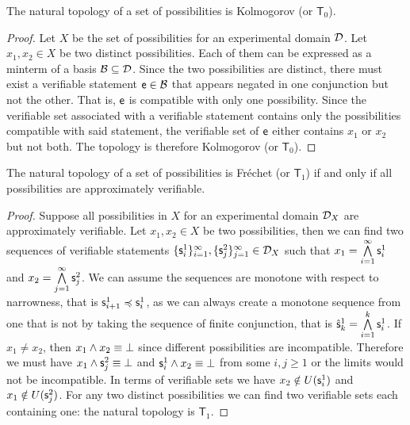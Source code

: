\documentclass[11pt,letterpaper,fleqn]{memoir} %
\begin{document}
\begin{mathSection}
	\begin{prop}
	The natural topology of a set of possibilities is Kolmogorov (or $\mathsf{T}_0$).
\end{prop}
\begin{proof}
	Let $X$ be the set of possibilities for an experimental domain $\edomain$. Let $x_1, x_2 \in X$ be two distinct possibilities. Each of them can be expressed as a minterm of a basis $\basis \subseteq \edomain$. Since the two possibilities are distinct, there must exist a verifiable statement $\stmt[e] \in \basis$ that appears negated in one conjunction but not the other. That is, $\stmt[e]$ is compatible with only one possibility. Since the verifiable set associated with a verifiable statement contains only the possibilities compatible with said statement, the verifiable set of $\stmt[e]$ either contains $x_1$ or $x_2$ but not both. The topology is therefore Kolmogorov (or $\mathsf{T}_0$).
\end{proof}
\begin{prop}
	The natural topology of a set of possibilities is Fr\'echet (or $\mathsf{T}_1$) if and only if all possibilities are approximately verifiable.
\end{prop}
\begin{proof}
	Suppose all possibilities in $X$ for an experimental domain $\edomain_X$ are approximately verifiable. Let $x_1, x_2 \in X$ be two possibilities, then we can find two sequences of verifiable statements $\{\stmt_i^1\}_{i=1}^\infty, \{\stmt_j^2\}_{j=1}^\infty \in \edomain_X$ such that $x_1=\bigAND\limits_{i=1}^\infty \stmt_i^1$ and $x_2=\bigAND\limits_{j=1}^\infty \stmt_j^2$. We can assume the sequences are monotone with respect to narrowness, that is $\stmt_{i+1}^1 \narrower \stmt_i^1$, as we can always create a monotone sequence from one that is not by taking the sequence of finite conjunction, that is $\hat{\stmt}_k^1=\bigAND\limits_{i=1}^k \stmt_i^1$. If $x_1 \neq x_2$, then $x_1 \AND x_2 \equiv \impossibility$ since different possibilities are incompatible. Therefore we must have $x_1 \AND \stmt_j^2 \equiv \impossibility$ and $\stmt_i^1 \AND x_2 \equiv \impossibility$ from some $i,j \geq 1$ or the limits would not be incompatible. In terms of verifiable sets we have $x_2 \notin U(\stmt_i^1)$ and $x_1 \notin U(\stmt_j^2)$. For any two distinct possibilities we can find two verifiable sets each containing one: the natural topology is $\mathsf{T}_1$.


\end{proof}
\end{mathSection}
\end{document}
